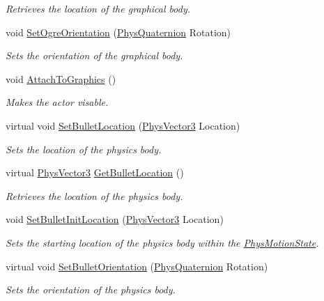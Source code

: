 \begin{DoxyCompactItemize}
\begin{DoxyCompactList}\small\item\em Retrieves the location of the graphical body. \item\end{DoxyCompactList}\item 
void \hyperlink{classActorBase_a55f45703e3d9b8de0cd07b23bd9460bf}{SetOgreOrientation} (\hyperlink{classPhysQuaternion}{PhysQuaternion} Rotation)
\begin{DoxyCompactList}\small\item\em Sets the orientation of the graphical body. \item\end{DoxyCompactList}\item 
void \hyperlink{classActorBase_afab604970fede16ccde0c6b8e72d9ee0}{AttachToGraphics} ()
\begin{DoxyCompactList}\small\item\em Makes the actor visable. \item\end{DoxyCompactList}\item 
virtual void \hyperlink{classActorBase_af64a57138bbd32c52581a5c8d0d29a76}{SetBulletLocation} (\hyperlink{classPhysVector3}{PhysVector3} Location)
\begin{DoxyCompactList}\small\item\em Sets the location of the physics body. \item\end{DoxyCompactList}\item 
virtual \hyperlink{classPhysVector3}{PhysVector3} \hyperlink{classActorBase_ae84ff822d2f962360bf291bb2c88eb3e}{GetBulletLocation} ()
\begin{DoxyCompactList}\small\item\em Retrieves the location of the physics body. \item\end{DoxyCompactList}\item 
void \hyperlink{classActorBase_af52177760d530df2b0987ed8626a656d}{SetBulletInitLocation} (\hyperlink{classPhysVector3}{PhysVector3} Location)
\begin{DoxyCompactList}\small\item\em Sets the starting location of the physics body within the \hyperlink{classPhysMotionState}{PhysMotionState}. \item\end{DoxyCompactList}\item 
virtual void \hyperlink{classActorBase_adf817bd5a7c562f31f6724a06a3a0f79}{SetBulletOrientation} (\hyperlink{classPhysQuaternion}{PhysQuaternion} Rotation)
\begin{DoxyCompactList}\small\item\em Sets the orientation of the physics body. \item\end{DoxyCompactList}\end{DoxyCompactItemize}
